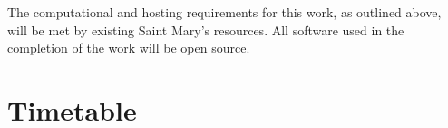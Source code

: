 \documentclass[12pt]{article}
\begin{document}
\begin{doublespacing}
The computational and hosting requirements for this work, as outlined above, will be met by existing Saint Mary's resources.
All software used in the completion of the work will be open source.

\pagebreak
\section{Timetable}

\pagebreak
\end{doublespacing}


\end{document}
